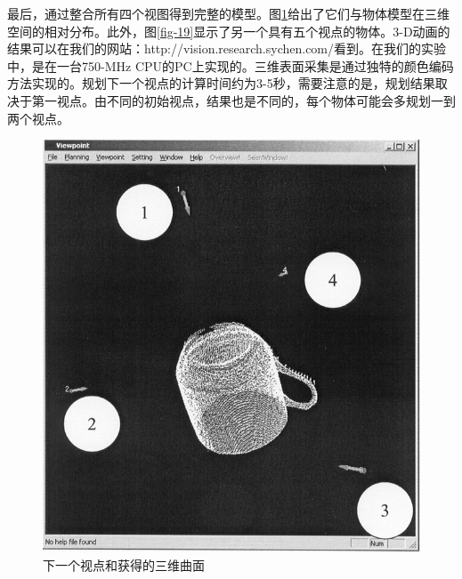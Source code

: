 \documentclass[AutoFakeBold,zihao=-4]{ctexart}
\begin{document}
	最后，通过整合所有四个视图得到完整的模型。图\ref{fig-18}给出了它们与物体模型在三维空间的相对分布。此外，图\ref{fig-19}显示了另一个具有五个视点的物体。3-D动画的结果可以在我们的网站：http://vision.research.sychen.com/看到。在我们的实验中，是在一台750-MHz CPU的PC上实现的。三维表面采集是通过独特的颜色编码方法实现的。规划下一个视点的计算时间约为3-5秒，需要注意的是，规划结果取决于第一视点。由不同的初始视点，结果也是不同的，每个物体可能会多规划一到两个视点。
	\begin{figure}[H]
		\centering
		\includegraphics[scale=0.4]{PIC18}
		\caption{下一个视点和获得的三维曲面}
		\label{fig-18}
	\end{figure}
\end{document}
